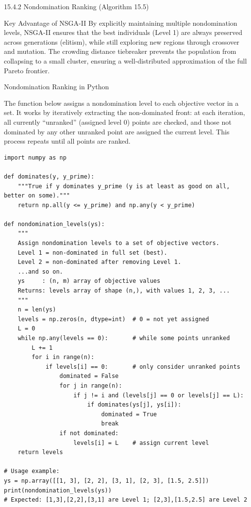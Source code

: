 \documentclass[aspectratio=169,10pt]{beamer}
\begin{document}
\begin{frame}[allowframebreaks]{15.4.2 Nondomination Ranking (Algorithm 15.5)}
\begin{alertblock}{Key Advantage of NSGA-II}
  By explicitly maintaining multiple nondomination levels, NSGA-II ensures
  that the best individuals (Level 1) are always preserved across generations
  (elitism), while still exploring new regions through crossover and mutation.
  The crowding distance tiebreaker prevents the population from collapsing
  to a small cluster, ensuring a well-distributed approximation of the full
  Pareto frontier.
\end{alertblock}

\end{frame}

\begin{frame}[fragile]{Nondomination Ranking in Python}

The function below assigns a nondomination level to each objective vector
in a set.  It works by iteratively extracting the non-dominated front: at
each iteration, all currently ``unranked'' (assigned level 0) points are
checked, and those not dominated by any other unranked point are assigned
the current level.  This process repeats until all points are ranked.

\begin{lstlisting}
import numpy as np

def dominates(y, y_prime):
    """True if y dominates y_prime (y is at least as good on all, better on some)."""
    return np.all(y <= y_prime) and np.any(y < y_prime)

def nondomination_levels(ys):
    """
    Assign nondomination levels to a set of objective vectors.
    Level 1 = non-dominated in full set (best).
    Level 2 = non-dominated after removing Level 1.
    ...and so on.
    ys     : (n, m) array of objective values
    Returns: levels array of shape (n,), with values 1, 2, 3, ...
    """
    n = len(ys)
    levels = np.zeros(n, dtype=int)  # 0 = not yet assigned
    L = 0
    while np.any(levels == 0):       # while some points unranked
        L += 1
        for i in range(n):
            if levels[i] == 0:       # only consider unranked points
                dominated = False
                for j in range(n):
                    if j != i and (levels[j] == 0 or levels[j] == L):
                        if dominates(ys[j], ys[i]):
                            dominated = True
                            break
                if not dominated:
                    levels[i] = L    # assign current level
    return levels

# Usage example:
ys = np.array([[1, 3], [2, 2], [3, 1], [2, 3], [1.5, 2.5]])
print(nondomination_levels(ys))
# Expected: [1,3],[2,2],[3,1] are Level 1; [2,3],[1.5,2.5] are Level 2
\end{lstlisting}

\end{frame}
\end{document}
